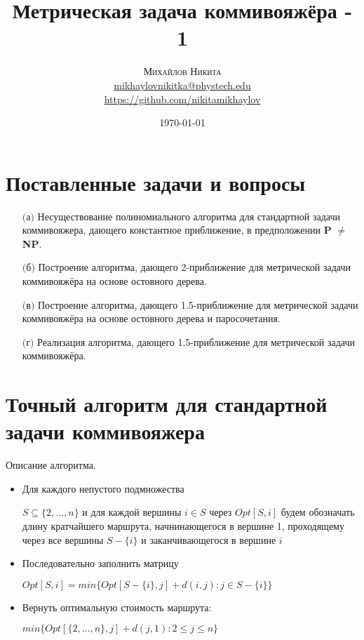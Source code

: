 \documentclass[A4, twocolumn]{article}
\title{
\textbf{Метрическая задача коммивояжёра - 1} 
}
\date{\today}
\author{ 
	\textsc{Михайлов Никита} \\
	\normalsize \href{mailto:mikhaylovnikitka@phystech.edu}{mikhaylovnikitka@phystech.edu} \\
	\normalsize \href{https://github.com/nikitamikhaylov}{https://github.com/nikitamikhaylov}
}
\begin{document}
    \maketitle
    
	
	\section{\textbf{Поставленные задачи и вопросы}}
	
		\begin{enumerate}
			\item[$($а$)$] Несуществование полиномиального алгоритма для стандартной задачи коммивояжера, дающего константное приближение, в предположении \textbf{P} $\ne$ \textbf{NP}.
			\item[$($б$)$] Построение алгоритма, дающего 2-приближение для метрической задачи коммивояжёра на основе остовного дерева.
			\item[$($в$)$] Построение алгоритма, дающего 1.5-приближение для метрической задачи коммивояжёра на основе остовного дерева и паросочетания. 
			\item[$($г$)$] Реализация алгоритма, дающего 1.5-приближение для метрической задачи коммивояжёра.
		\end{enumerate}
	
	\section{\textbf{Точный алгоритм для стандартной задачи коммивояжера}}	
	Описание алгоритма.
	\begin{itemize}
		\item Для каждого непустого подмножества 
		
		$S \subseteq \{2, . . . , n\}$ и для каждой вершины $i \in S$ через $Opt[S,i]$ будем обозначать длину кратчайшего маршрута, начнинающегося в вершине 1, проходящему через все вершины $S − \{i\}$ и заканчивающегося в вершине $i$
		\item Последовательно заполнить матрицу 
		
		$Opt [S , i ] = min\{Opt [S − \{i \}, j ] + d (i , j ) : j ∈ S − \{i \}\}$
		\item Вернуть оптимальную стоимость маршрута: 
		
		$min\{Opt[\{2,...,n\},j]+d(j,1):2 \leq j \leq n\}$
	\end{itemize}		
\end{document}

